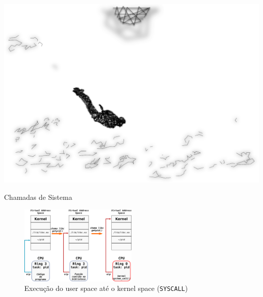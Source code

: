 \documentclass[xcolor={usenames,svgnames,dvipsnames},brazil,english,12pt,aspectratio=149]{beamer}
\begin{document}
%
%

\begin{frame}[plain]
  \includegraphics[width=\textwidth]{presentation_sec_five}
\end{frame}


\begin{frame}{Chamadas de Sistema}
  \begin{figure}[!h]
    \centering
    \includegraphics[width=0.5\textwidth]{userspace_to_kernel} 
    \caption*{Execução do user space até o kernel space (\texttt{SYSCALL})}
  \end{figure}
\end{frame}
\end{document}
